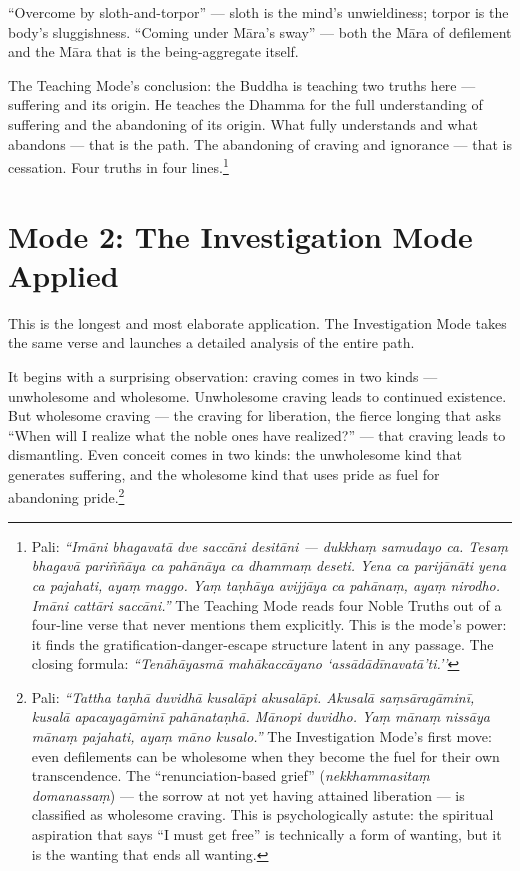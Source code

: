 ``Overcome by sloth-and-torpor'' --- sloth is the mind's unwieldiness; torpor is the body's sluggishness. ``Coming under Māra's sway'' --- both the Māra of defilement and the Māra that is the being-aggregate itself.

The Teaching Mode's conclusion: the Buddha is teaching two truths here --- suffering and its origin. He teaches the Dhamma for the full understanding of suffering and the abandoning of its origin. What fully understands and what abandons --- that is the path. The abandoning of craving and ignorance --- that is cessation. Four truths in four lines.\footnote{Pali: \textit{``Imāni bhagavatā dve saccāni desitāni --- dukkhaṃ samudayo ca. Tesaṃ bhagavā pariññāya ca pahānāya ca dhammaṃ deseti. Yena ca parijānāti yena ca pajahati, ayaṃ maggo. Yaṃ taṇhāya avijjāya ca pahānaṃ, ayaṃ nirodho. Imāni cattāri saccāni.''} The Teaching Mode reads four Noble Truths out of a four-line verse that never mentions them explicitly. This is the mode's power: it finds the gratification-danger-escape structure latent in any passage. The closing formula: \textit{``Tenāhāyasmā mahākaccāyano `assādādīnavatā'ti.''}}

\section*{Mode 2: The Investigation Mode Applied}

This is the longest and most elaborate application. The Investigation Mode takes the same verse and launches a detailed analysis of the entire path.

It begins with a surprising observation: craving comes in two kinds --- unwholesome and wholesome. Unwholesome craving leads to continued existence. But wholesome craving --- the craving for liberation, the fierce longing that asks ``When will I realize what the noble ones have realized?'' --- that craving leads to dismantling. Even conceit comes in two kinds: the unwholesome kind that generates suffering, and the wholesome kind that uses pride as fuel for abandoning pride.\footnote{Pali: \textit{``Tattha taṇhā duvidhā kusalāpi akusalāpi. Akusalā saṃsāragāminī, kusalā apacayagāminī pahānataṇhā. Mānopi duvidho. Yaṃ mānaṃ nissāya mānaṃ pajahati, ayaṃ māno kusalo.''} The Investigation Mode's first move: even defilements can be wholesome when they become the fuel for their own transcendence. The ``renunciation-based grief'' (\textit{nekkhammasitaṃ domanassaṃ}) --- the sorrow at not yet having attained liberation --- is classified as wholesome craving. This is psychologically astute: the spiritual aspiration that says ``I must get free'' is technically a form of wanting, but it is the wanting that ends all wanting.}

